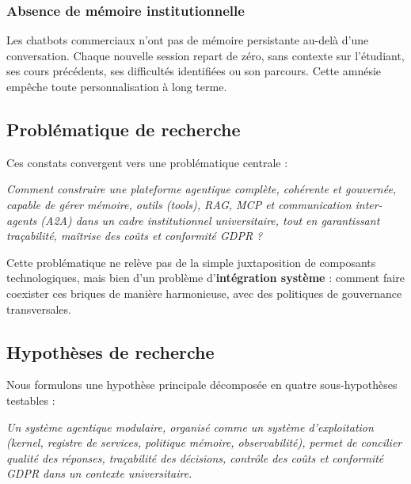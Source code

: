 \documentclass[12pt, a4paper]{article}
\begin{document}
\subsubsection{Absence de mémoire institutionnelle}

Les chatbots commerciaux n'ont pas de mémoire persistante au-delà d'une conversation. Chaque nouvelle session repart de zéro, sans contexte sur l'étudiant, ses cours précédents, ses difficultés identifiées ou son parcours. Cette amnésie empêche toute personnalisation à long terme.

\subsection{Problématique de recherche}

Ces constats convergent vers une problématique centrale :

\newpage
\begin{importantbox}[Problématique]
\textit{Comment construire une plateforme agentique complète, cohérente et gouvernée, capable de gérer mémoire, outils (\textit{tools}), RAG, MCP et communication inter-agents (A2A) dans un cadre institutionnel universitaire, tout en garantissant traçabilité, maîtrise des coûts et conformité GDPR ?}
\end{importantbox}

Cette problématique ne relève pas de la simple juxtaposition de composants technologiques, mais bien d'un problème d'\textbf{intégration système} : comment faire coexister ces briques de manière harmonieuse, avec des politiques de gouvernance transversales.

\subsection{Hypothèses de recherche}

Nous formulons une hypothèse principale décomposée en quatre sous-hypothèses testables :

\begin{definitionbox}
\textit{Un système agentique modulaire, organisé comme un système d'exploitation (kernel, registre de services, politique mémoire, observabilité), permet de concilier qualité des réponses, traçabilité des décisions, contrôle des coûts et conformité GDPR dans un contexte universitaire.}
\end{definitionbox}
\end{document}
